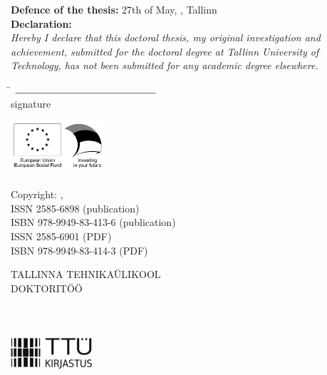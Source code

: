 \noindent
\textbf{Defence of the thesis:} 27th of May, \Year, Tallinn \\ %

\noindent
\textbf{Declaration:} \\
\textit{Hereby I declare that this doctoral thesis, my original investigation and achievement, submitted for the doctoral degree at Tallinn University of Technology, has not been submitted for any academic degree elsewhere.}\\

\begin{tabbing}
\AuthorName \qquad \qquad \qquad \= $\rule{5cm}{0.15mm}$\\
\> \hspace*{1.5cm} {\footnotesize signature} \\ %
\end{tabbing}
\hspace{3mm}
\includegraphics[width=35mm]{./img/eu_social_fund.jpg}\\
\\
\noindent
Copyright: \AuthorName, \Year\\
ISSN 2585-6898 (publication)\\
ISBN 978-9949-83-413-6 (publication)\\
ISSN 2585-6901 (PDF) \\
ISBN 978-9949-83-414-3 (PDF)\\

\clearpage
\thispagestyle{empty}



\begin{centering}
{\large
TALLINNA TEHNIKA\"ULIKOOL \\
DOKTORIT\"O\"O \\
\ThesisNumber \\
}
\vspace{5.5CM}
{\huge
\bf{
\ThesisTitleEST \\
}
}
\vspace{4.2cm}
{\fontsize{16}{19.2} \selectfont \MakeUppercase{\AuthorName}} \\
\vspace{5cm}
\includegraphics[height=12mm]{./img/TTU_kirjastus_EST_mv_200x79.jpg}\\
\end{centering}

